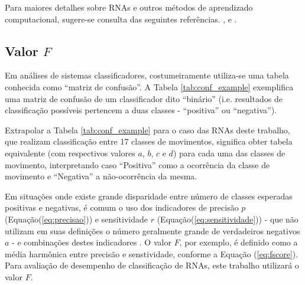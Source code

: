 Para maiores detalhes sobre RNAs e outros métodos de aprendizado computacional, sugere-se consulta das seguintes referências. \cite{YEGNANARAYANA2009}, \cite{Abraham2005} e \cite{Drew20003}.

			\subsection{Valor $F$}
Em análises de sistemas classificadores, costumeiramente utiliza-se uma tabela conhecida como ``matriz de confusão''. A Tabela \ref{tab:conf_example} exemplifica uma matriz de confusão de um classificador dito ``binário'' (i.e. resultados de classificação possíveis pertencem a duas classes - ``positiva'' ou ``negativa'').

\begin{table}[htb]
\end{table}

Extrapolar a Tabela \ref{tab:conf_example} para o caso das RNAs deste trabalho, que realizam classificação entre 17 classes de movimentos, significa obter tabela equivalente (com respectivos valores $a$, $b$, $c$ e $d$) para cada uma das classes de movimento, interpretando caso ``Positiva'' como a ocorrência da classe de movimento e ``Negativa'' a não-ocorrência da mesma.

Em situações onde existe grande disparidade entre número de classes esperadas positivas e negativas, é comum o uso dos indicadores de precisão $p$ (Equação(\ref{eq:precisao})) e sensitividade $r$ (Equação(\ref{eq:sensitividade})) - que não utilizam em suas definições o número geralmente grande de verdadeiros negativos $a$ - e combinações destes indicadores \cite{Kubat1998}. O valor $F$, por exemplo, é definido como a média harmônica entre precisão e senstividade, conforme a Equação (\ref{eq:fscore}). Para avaliação de desempenho de classificação de RNAs, este trabalho utilizará o valor $F$.

